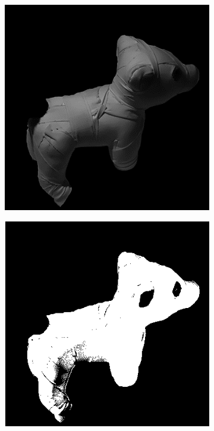 \documentclass[11pt]{article}
\begin{document}
\begin{figure}[!hbt]
  
    \begin{subfigure}[h]{0.3\textwidth}
    \centering
    \includegraphics[width = \textwidth]{../dog-png/dog4.png}
  \end{subfigure} 
   \begin{subfigure}[h]{0.3\textwidth}
    \centering
    \includegraphics[width = \textwidth]{../dog-png/mask.png}
  \end{subfigure} 
  

\end{figure}
\end{document}
